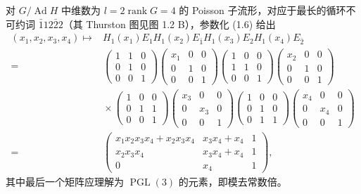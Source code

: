 对 $G/\operatorname{Ad}H$ 中维数为 $l=2\operatorname{rank}G=4$ 的 Poisson 子流形，对应于最长的循环不可约词 $\bar112\bar22$（其 Thurston 图见图 1.2 B），参数化 (1.6) 给出
\begin{equation}\label{eq:1.11}
\begin{aligned}
(x_1,x_2,x_3,x_4)\mapsto{}&H_1(x_1)E_1H_1(x_2)E_{\bar1}H_1(x_3)E_2H_1(x_4)E_{\bar2}\\
={}&\begin{pmatrix}1&1&0\\0&1&0\\0&0&1\end{pmatrix}
\begin{pmatrix}x_1&0&0\\0&1&0\\0&0&1\end{pmatrix}
\begin{pmatrix}1&0&0\\1&1&0\\0&0&1\end{pmatrix}
\begin{pmatrix}x_2&0&0\\0&1&0\\0&0&1\end{pmatrix}\\
&{}\times
\begin{pmatrix}1&0&0\\0&1&1\\0&0&1\end{pmatrix}
\begin{pmatrix}x_3&0&0\\0&x_3&0\\0&0&1\end{pmatrix}
\begin{pmatrix}1&0&0\\0&1&0\\0&1&1\end{pmatrix}
\begin{pmatrix}x_4&0&0\\0&x_4&0\\0&0&1\end{pmatrix}\\
={}&\begin{pmatrix}
x_1x_2x_3x_4+x_2x_3x_4&x_3x_4+x_4&1\\
x_2x_3x_4&x_3x_4+x_4&1\\
0&x_4&1
\end{pmatrix},
\end{aligned}
\tag{1.11}
\end{equation}
其中最后一个矩阵应理解为 $\operatorname{PGL}(3)$ 的元素，即模去常数倍。

